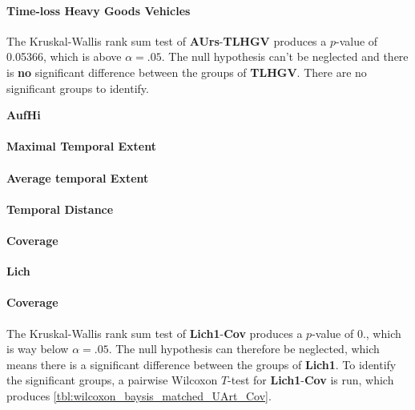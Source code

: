 \paragraph{Time-loss Heavy Goods Vehicles}
The Kruskal-Wallis rank sum test of \textbf{AUrs}-\textbf{TLHGV} produces a $p$-value of 0.05366, which is above $\alpha=.05$. The null hypothesis can't be neglected and there is \textbf{no} significant difference between the groups of \textbf{TLHGV}. There are no significant groups to identify.

\Large
\centerline{\textbf{AufHi}}
\normalsize

\paragraph{Maximal Temporal Extent}





\paragraph{Average temporal Extent}
\paragraph{Temporal Distance}
\paragraph{Coverage}

\Large
\centerline{\textbf{Lich}}
\normalsize

\paragraph{Coverage}
The Kruskal-Wallis rank sum test of \textbf{Lich1}-\textbf{Cov} produces a $p$-value of 0., which is way below $\alpha=.05$. The null hypothesis can therefore be neglected, which means there is a significant difference between the groups of \textbf{Lich1}. To identify the significant groups, a pairwise Wilcoxon $T$-test for \textbf{Lich1}-\textbf{Cov} is run, which produces \autoref{tbl:wilcoxon_baysis_matched_UArt_Cov}. 

